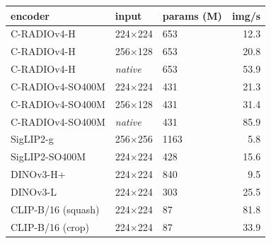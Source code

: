 \begin{tabular}{lllr}
\toprule
encoder & input & params (M) & img/s \\
\midrule
C-RADIOv4-H & 224$\times$224 & 653 & 12.3 \\
C-RADIOv4-H & 256$\times$128 & 653 & 20.8 \\
C-RADIOv4-H & \textit{native} & 653 & 53.9 \\
C-RADIOv4-SO400M & 224$\times$224 & 431 & 21.3 \\
C-RADIOv4-SO400M & 256$\times$128 & 431 & 31.4 \\
C-RADIOv4-SO400M & \textit{native} & 431 & 85.9 \\
SigLIP2-g & 256$\times$256 & 1163 & 5.8 \\
SigLIP2-SO400M & 224$\times$224 & 428 & 15.6 \\
DINOv3-H+ & 224$\times$224 & 840 & 9.5 \\
DINOv3-L & 224$\times$224 & 303 & 25.5 \\
CLIP-B/16 (squash) & 224$\times$224 & 87 & 81.8 \\
CLIP-B/16 (crop) & 224$\times$224 & 87 & 33.9 \\
\bottomrule
\end{tabular}
